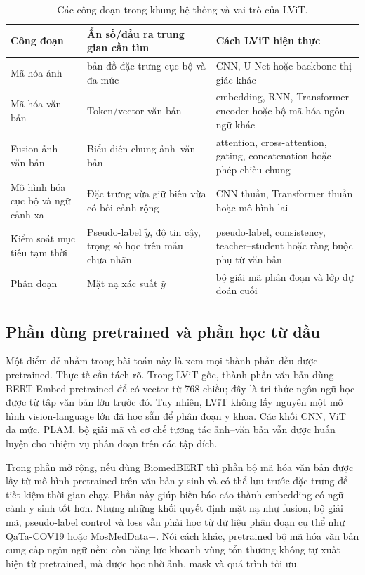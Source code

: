 \begin{table}[H]
  \centering
  \caption{Các công đoạn trong khung hệ thống và vai trò của LViT.}
  \label{tab:problem-khung hệ thống}
  \small
  \renewcommand{\arraystretch}{1.15}
  \setlength{\tabcolsep}{3pt}
  \begin{tabularx}{\textwidth}{@{}p{} X X@{}}
    \toprule
    Công đoạn & Ẩn số/đầu ra trung gian cần tìm & Cách LViT hiện thực \\
    \midrule
    Mã hóa ảnh & bản đồ đặc trưng cục bộ và đa mức & CNN, U-Net hoặc backbone thị giác khác \\
    Mã hóa văn bản & Token/vector văn bản & embedding, RNN, Transformer encoder hoặc bộ mã hóa ngôn ngữ khác \\
    Fusion ảnh--văn bản & Biểu diễn chung ảnh--văn bản & attention, cross-attention, gating, concatenation hoặc phép chiếu chung \\
    Mô hình hóa cục bộ và ngữ cảnh xa & Đặc trưng vừa giữ biên vừa có bối cảnh rộng & CNN thuần, Transformer thuần hoặc mô hình lai \\
    Kiểm soát mục tiêu tạm thời & Pseudo-label \(\tilde{y}\), độ tin cậy, trọng số học trên mẫu chưa nhãn & pseudo-label, consistency, teacher--student hoặc ràng buộc phụ từ văn bản \\
    Phân đoạn & Mặt nạ xác suất \(\hat{y}\) & bộ giải mã phân đoạn và lớp dự đoán cuối \\
    \bottomrule
  \end{tabularx}
\end{table}
\FloatBarrier

\subsection{Phần dùng pretrained và phần học từ đầu}

Một điểm dễ nhầm trong bài toán này là xem mọi thành phần đều được pretrained. Thực tế cần tách rõ. Trong LViT gốc, thành phần văn bản dùng BERT-Embed pretrained để có vector từ 768 chiều; đây là tri thức ngôn ngữ học được từ tập văn bản lớn trước đó. Tuy nhiên, LViT không lấy nguyên một mô hình vision-language lớn đã học sẵn để phân đoạn y khoa. Các khối CNN, ViT đa mức, PLAM, bộ giải mã và cơ chế tương tác ảnh--văn bản vẫn được huấn luyện cho nhiệm vụ phân đoạn trên các tập đích.

Trong phần mở rộng, nếu dùng BiomedBERT thì phần bộ mã hóa văn bản được lấy từ mô hình pretrained trên văn bản y sinh và có thể lưu trước đặc trưng để tiết kiệm thời gian chạy. Phần này giúp biến báo cáo thành embedding có ngữ cảnh y sinh tốt hơn. Nhưng những khối quyết định mặt nạ như fusion, bộ giải mã, pseudo-label control và loss vẫn phải học từ dữ liệu phân đoạn cụ thể như QaTa-COV19 hoặc MosMedData+. Nói cách khác, pretrained bộ mã hóa văn bản cung cấp ngôn ngữ nền; còn năng lực khoanh vùng tổn thương không tự xuất hiện từ pretrained, mà được học nhờ ảnh, mask và quá trình tối ưu.

